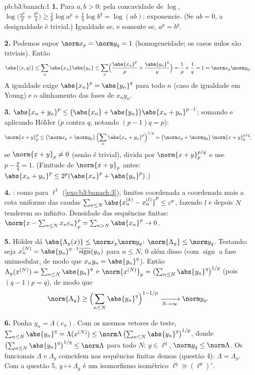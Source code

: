 \begin{solution}{pb:b3:banach:1}
\textbf{1.} Para $a, b > 0$: pela concavidade de $\log$,
$\log\bigl(\tfrac{a^p}p + \tfrac{b^q}q\bigr) \geq \tfrac1p\log
a^p + \tfrac1q\log b^q = \log(ab)$; exponencie. (Se $ab = 0$,
a desigualdade é trivial.) Igualdade se, e somente se, $a^p = b^q$.

\textbf{2.} Podemos supor $\norm x_p = \norm y_q = 1$
(homogeneidade; os casos nulos são triviais). Então
\[
\abs{\langle x, y\rangle} \leq \sum_n\abs{x_n}\abs{y_n}
\leq \sum_n\Bigl(\frac{\abs{x_n}^p}p +
\frac{\abs{y_n}^q}q\Bigr) = \frac1p + \frac1q = 1 =
\norm x_p\norm y_q .
\]
A igualdade exige $\abs{x_n}^p = \abs{y_n}^q$ para todo $n$
(caso de igualdade em Young) e o alinhamento das fases de
$x_ny_n$.

\textbf{3.} $\abs{x_n + y_n}^p \leq \bigl(\abs{x_n} +
\abs{y_n}\bigr)\abs{x_n + y_n}^{p-1}$; somando e aplicando
Hölder ($p$ contra $q$, notando $(p - 1)q = p$):
\[
\norm{x + y}_p^p \leq \bigl(\norm x_p + \norm
y_p\bigr)\,\Bigl(\sum_n\abs{x_n + y_n}^{p}\Bigr)^{1/q}
= \bigl(\norm x_p + \norm y_p\bigr)\,\norm{x+y}_p^{p/q};
\]
se $\norm{x + y}_p \neq 0$ (senão é trivial), divida por
$\norm{x+y}_p^{p/q}$ e use $p - \frac pq = 1$. (Finitude de
$\norm{x+y}_p$ antes: $\abs{x_n+y_n}^p \leq
2^p(\abs{x_n}^p + \abs{y_n}^p)$.)

\textbf{4.} : como para $\ell^1$
(\cref{exo:b3:banach:3}), limites coordenada a coordenada mais a
cota uniforme das caudas $\sum_{n\leq N}\abs{x^{(k)}_n - x^{(l)}_n}^p
\leq \varepsilon^p$, fazendo $l$ e depois $N$ tenderem ao infinito.
Densidade das sequências finitas: $\norm{x - \sum_{n\leq
N}x_ne_n}_p^p = \sum_{n > N}\abs{x_n}^p \to 0$.

\textbf{5.} Hölder dá $\abs{\Lambda_y(x)} \leq \norm
x_p\norm y_q$: $\norm{\Lambda_y} \leq \norm y_q$. Testando: seja
$x^{(N)}_n = \abs{y_n}^{q-1}\overline{\operatorname{sign}}(y_n)$
para $n \leq N$, $0$ além disso (com $\operatorname{sign}$ a
fase unimodular, de modo que $x_ny_n = \abs{y_n}^q$). Então
$\Lambda_y(x^{(N)}) = \sum_{n\leq N}\abs{y_n}^q$ e
$\norm{x^{(N)}}_p = \bigl(\sum_{n\leq
N}\abs{y_n}^{q}\bigr)^{1/p}$ (pois $(q-1)p = q$), de modo que
\[
\norm{\Lambda_y} \geq \Bigl(\sum_{n\leq
N}\abs{y_n}^q\Bigr)^{1 - 1/p} \xrightarrow[N\to\infty]{}
\norm y_q .
\]

\textbf{6.} Ponha $y_n = \Lambda(e_n)$. Com os mesmos vetores de
teste, $\sum_{n \leq N}\abs{y_n}^q = \Lambda(x^{(N)}) \leq
\norm\Lambda\,\bigl(\sum_{n\leq N}\abs{y_n}^q\bigr)^{1/p}$,
donde $\bigl(\sum_{n\leq N}\abs{y_n}^q\bigr)^{1/q} \leq
\norm\Lambda$ para todo $N$: $y \in \ell^q$, $\norm y_q \leq
\norm\Lambda$. Os funcionais $\Lambda$ e $\Lambda_y$ coincidem
nas sequências finitas densas (questão 4): $\Lambda =
\Lambda_y$. Com a questão 5, $y \mapsto \Lambda_y$ é um
isomorfismo isométrico $\ell^q \cong (\ell^p)'$.


\end{solution}
